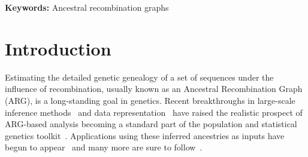 \documentclass{article}
\begin{document}
\textbf{Keywords:} Ancestral recombination graphs

\section*{Introduction}
Estimating the detailed genetic genealogy of a set of sequences
under the influence of recombination,
usually known as an Ancestral Recombination Graph (ARG), is a long-standing
goal in genetics.
Recent breakthroughs
in large-scale inference
methods~\citep{rasmussen2014genome,kelleher2019inferring,speidel2019method,
schaefer2021ancestral,wohns2022unified,zhang2023biobank,zhan2023towards}
and data representation~\citep{kelleher2016efficient,kelleher2018efficient}
have raised the realistic prospect of ARG-based analysis becoming a standard part
of the population and statistical genetics toolkit~\citep{hejase2020summary}.
Applications using these inferred ancestries as inputs have begun to
appear~\citep{osmond2021estimating,fan2022genealogical,hejase2022deep,zhang2023biobank,
nowbandegani2022extremely}
and many more are sure to
follow~\citep{harris2019database,harris2023using}.
\end{document}
